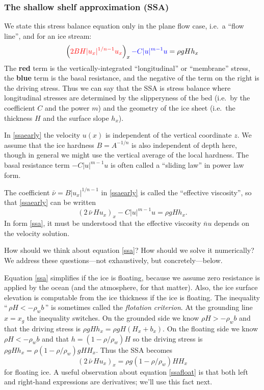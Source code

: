 \documentclass[titlepage,letterpaper,final,12pt]{scrartcl}
\begin{document}
\subsubsection*{The shallow shelf approximation (SSA)}  We state this stress balance equation only in the plane flow case, i.e.~a ``flow line'', and for an ice stream:
\begin{equation}
  \left({\color{red} 2 B H |u_x|^{1/n - 1} u_x}\right)_x {\color{blue} - C|u|^{m-1}u} = \rho g H h_x \label{ssaearly}
\end{equation}
The {\color{red} \textbf{red} term} is the vertically-integrated ``longitudinal'' or ``membrane'' stress, the {\color{blue} \textbf{blue} term} is the basal resistance, and the negative of the term on the right is the driving stress.  Thus we can say that the SSA is stress balance where longitudinal stresses are determined by the slipperyness of the bed (i.e.~by the coefficient $C$ and the power $m$) and the geometry of the ice sheet (i.e.~the thickness $H$ and the surface slope $h_x$).

In \eqref{ssaearly} the velocity $u(x)$ is independent of the vertical coordinate $z$.  We assume that the ice hardness $B=A^{-1/n}$ is also independent of depth here, though in general we might use the vertical average of the local hardness.  The basal resistance term $- C|u|^{m-1}u$ is often called a ``sliding law'' in power law form.

The coefficient $\bar \nu = B |u_x|^{1/n-1}$ in \eqref{ssaearly} is called the ``effective viscosity'', so that \eqref{ssaearly} can be written
\begin{equation}
  \left(2 \,\bar \nu\, H u_x\right)_x - C |u|^{m-1} u = \rho g H h_x.  \label{ssa}
\end{equation}
In form \eqref{ssa}, it must be understood that the effective viscosity $\bar nu$ depends on the velocity solution.

How should we think about equation \eqref{ssa}?  How should we solve it numerically?  We address these questions---not exhaustively, but concretely---below.

Equation \eqref{ssa} simplifies if the ice is floating, because we assume zero resistance is applied by the ocean (and the atmosphere, for that matter).  Also, the ice surface elevation is computable from the ice thickness if the ice is floating.  The inequality ``$\,\rho H < - \rho_w b\,$'' is sometimes called the \emph{flotation criterion}.  At the grounding line $x=x_g$ the inequality switches.  On the grounded side we know $\rho H > - \rho_w b$ and that the driving stress is $\rho g H h_x = \rho g H (H_x + b_x)$.  On the floating side we know $\rho H < - \rho_w b$ and that $h = (1-\rho/\rho_w) H$ so the driving stress is $\rho g H h_x = \rho(1-\rho/\rho_w) g H H_x$.  Thus the SSA becomes
\begin{equation}
   \left(2 \,\bar\nu\, H u_x\right)_x = \rho g (1-\rho/\rho_w) H H_x \label{ssafloat}
\end{equation}
for floating ice.  A useful observation about equation \eqref{ssafloat} is that both left and right-hand expressions are derivatives; we'll use this fact next.
\end{document}
